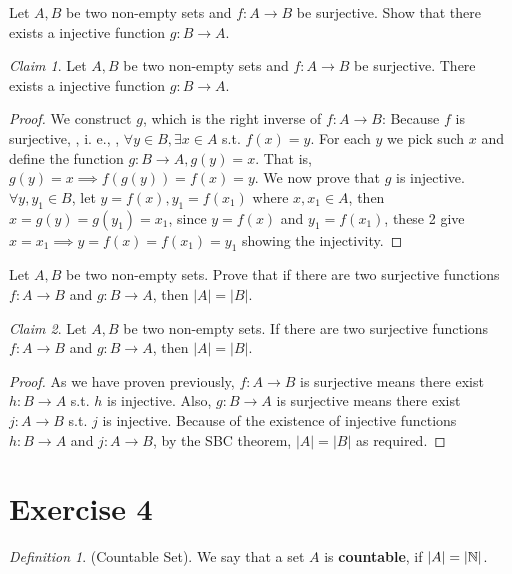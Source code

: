 \documentclass{homework}
\newcommand*{\ie}{\leavevmode\unskip, i. e., \ignorespaces} %
\newcommand{\N}{\bb{N}} %
\newcommand{\ra}{\rightarrow}
\newcommand{\?}{\stackrel{?}{=}}
\newcommand{\func}[3]{#1: #2 \rightarrow #3}
\theoremstyle{remark}
\newtheorem*{claim}{Claim}
\newtheorem*{definition}{Definition}
\begin{document}
\question[3] Let $A,B$ be two non-empty sets and $\func{f}{A}{B}$ be surjective. Show that there exists a injective function $\func{g}{B}{A}$.
\begin{claim}
    Let $A,B$ be two non-empty sets and $\func{f}{A}{B}$ be surjective. There exists a injective function $\func{g}{B}{A}$.
\end{claim}
\begin{proof}
    We construct $g$, which is the right inverse of $f: A\ra B$: Because $f$ is surjective, \ie, $\forall y\in B, \exists x\in A$ s.t. $f(x)=y$. For each $y$ we pick such $x$ and define the function $g:B\ra A, g(y)=x$. That is, $g(y)=x\implies f(g(y))=f(x)=y$. We now prove that $g$ is injective. $\forall y,y_1\in B$, let $y=f(x), y_1=f(x_1)$ where $x,x_1\in A$, then $x=g(y)=g(y_1)=x_1$, since $y=f(x)$ and $y_1=f(x_1)$, these 2 give $x=x_1\implies y=f(x)=f(x_1)=y_1$ showing the injectivity. 
\end{proof}

\question[4] Let $A,B$ be two non-empty sets. Prove that if there are two surjective functions $\func{f}{A}{B}$ and $\func{g}{B}{A}$, then $|A|=|B|$. 

\begin{claim}
    Let $A,B$ be two non-empty sets. If there are two surjective functions $\func{f}{A}{B}$ and $\func{g}{B}{A}$, then $|A|=|B|$. 
\end{claim}
\begin{proof}
    As we have proven previously, $f:A\ra B$ is surjective means there exist $h:B\ra A$ s.t. $h$ is injective. Also, $g:B\ra A$ is surjective means there exist $j: A\ra B$ s.t. $j$ is injective. Because of the existence of injective functions $h: B\ra A$ and $j: A\ra B$, by the SBC theorem, $|A|=|B|$ as required. 
\end{proof}

\newpage
\section*{Exercise 4}

\begin{definition}
    (Countable Set). We say that a set $A$ is \textbf{countable}, if $|A|=|\N|$.
\end{definition}
\end{document}
